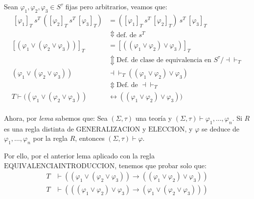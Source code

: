 \documentclass{article}
\begin{document}
Sean $\varphi_1,\varphi_2,\varphi_3\in S^\tau$ fijas pero arbitrarios, veamos que:
\begin{equation*}
  \begin{aligned}
    \ [\varphi_1]_T\ s^T\ ([\varphi_2]_T\ s^T\ [\varphi_3]_T) & =([\varphi_1]_T\ s^T\ [\varphi_2]_T)\ s^T\ [\varphi_3]_T                  \\
                                                              & \Updownarrow\text{def. de }s^T                                            \\
    [(\varphi_1\lor(\varphi_2\lor\varphi_3))]_T               & =[((\varphi_1\lor\varphi_2)\lor\varphi_3)]_T                              \\
                                                              & \Updownarrow\text{Def. de clase de equivalencia en }S^\tau/\dashv\vdash_T \\
    (\varphi_1\lor(\varphi_2\lor\varphi_3))                   & \dashv\vdash_T((\varphi_1\lor\varphi_2)\lor\varphi_3)                     \\
                                                              & \Updownarrow\text{Def. de }\dashv\vdash_T                                 \\
    T\vdash((\varphi_1\lor(\varphi_2\lor\varphi_3))           & \leftrightarrow((\varphi_1\lor\varphi_2)\lor\varphi_3))                   \\
  \end{aligned}
\end{equation*}

Ahora, por \textit{lema} sabemos que: Sea $(\Sigma,\tau)$ una teoría y $(\Sigma,\tau)\vdash\varphi_1,\dots,\varphi_n$. Si $R$ es una regla distinta de $\text{GENERALIZACION}$ y $\text{ELECCION}$, y $\varphi$ se deduce de $\varphi_1,\dots,\varphi_n$ por la regla $R$, entonces $(\Sigma,\tau)\vdash\varphi$.

Por ello, por el anterior lema aplicado con la regla $\text{EQUIVALENCIAINTRODUCCION}$, tenemos que probar solo que:
\begin{equation*}
  \begin{aligned}
    T & \vdash((\varphi_1\lor(\varphi_2\lor\varphi_3))\to((\varphi_1\lor\varphi_2)\lor\varphi_3)) \\
    T & \vdash(((\varphi_1\lor\varphi_2)\lor\varphi_3)\to(\varphi_1\lor(\varphi_2\lor\varphi_3)))
  \end{aligned}
\end{equation*}
\end{document}
